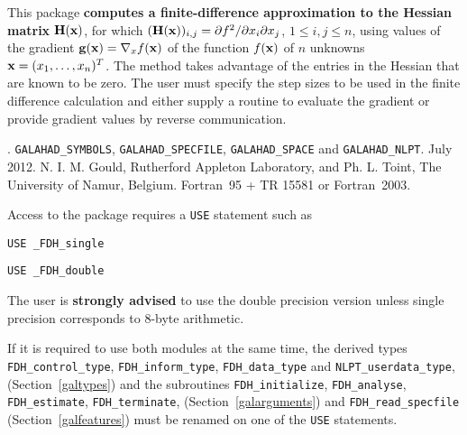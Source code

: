 \documentclass{galahad}
\newcommand{\packagename}{FDH}
\newcommand{\fullpackagename}{\libraryname\_\packagename}
\begin{document}
\galheader


\galsummary
This package 
{\bf computes a finite-difference approximation to the Hessian matrix} 
${\mathbf{H}}({\mathbf{x}})$, for which  
$({\mathbf{H}}({\mathbf{x}}))_{i,j} = \partial f^2 / \partial x_i \partial x_j$,
$1 \leq i, j \leq n$,  
using values of the gradient ${\mathbf{g}}({\mathbf{x}}) = \nabla_x f({\mathbf{x}})$ 
of the function $f({\mathbf{x}})$ of $n$ unknowns ${\mathbf{x}} = (x_1, \ldots, x_n)^T$. 
The method takes advantage of the entries in the Hessian that are known to
be zero.  The user must specify the step sizes to be used in the
finite difference calculation and either supply a routine to evaluate
the gradient or provide gradient values by reverse communication.


\galattributes
\galversions{\tt  \fullpackagename\_single, \fullpackagename\_double}.
\galuses 
{\tt GALAHAD\_SY\-M\-BOLS}, 
{\tt GALAHAD\_SP\-ECFILE},
{\tt GALAHAD\_SPACE} and
{\tt GALAHAD\_NLPT}.
\galdate July 2012.
\galorigin N. I. M. Gould, Rutherford Appleton Laboratory,
and Ph. L. Toint, The University of Namur, Belgium.
\gallanguage Fortran~95 + TR 15581 or Fortran~2003. 


\galhowto


Access to the package requires a {\tt USE} statement such as

\medskip{}

\hspace{8mm} {\tt USE \fullpackagename\_single}

\medskip{}

\hspace{8mm} {\tt USE  \fullpackagename\_double}

\medskip

\noindent
The user is {\bf strongly advised} to use the double
precision version unless single precision corresponds to 8-byte arithmetic.

If it is required to use both modules at the same time, the derived types 
{\tt \packagename\_control\_type}, 
{\tt \packagename\_inform\_type},
{\tt \packagename\_data\_type}
and
{\tt NLPT\_userdata\_type},
(Section~\ref{galtypes})
and the subroutines
{\tt \packagename\_initialize}, 
{\tt \packagename\_\-analyse},
{\tt \packagename\_\-estimate},
{\tt \packagename\_terminate},
(Section~\ref{galarguments})
and 
{\tt \packagename\_read\_specfile}
(Section~\ref{galfeatures})
must be renamed on one of the {\tt USE} statements.
\end{document}
